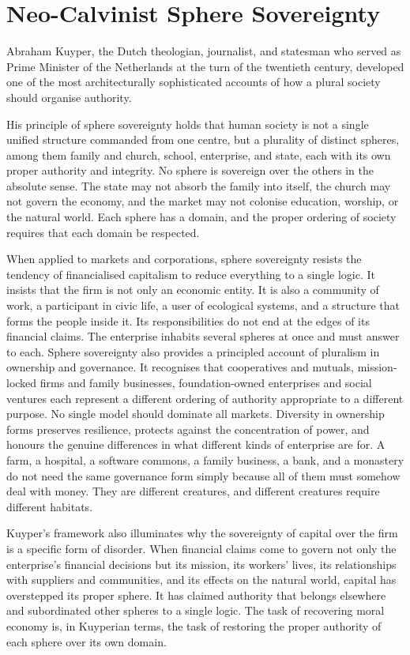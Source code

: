\documentclass[11pt,a4paper,oneside]{book}
\begin{document}
\section*{Neo-Calvinist Sphere Sovereignty}

Abraham Kuyper, the Dutch theologian, journalist, and statesman who served as Prime Minister of the Netherlands at the turn of the twentieth century, developed one of the most architecturally sophisticated accounts of how a plural society should organise authority.

His principle of sphere sovereignty holds that human society is not a single unified structure commanded from one centre, but a plurality of distinct spheres, among them family and church, school, enterprise, and state, each with its own proper authority and integrity. No sphere is sovereign over the others in the absolute sense. The state may not absorb the family into itself, the church may not govern the economy, and the market may not colonise education, worship, or the natural world. Each sphere has a domain, and the proper ordering of society requires that each domain be respected.

When applied to markets and corporations, sphere sovereignty resists the tendency of financialised capitalism to reduce everything to a single logic. It insists that the firm is not only an economic entity. It is also a community of work, a participant in civic life, a user of ecological systems, and a structure that forms the people inside it. Its responsibilities do not end at the edges of its financial claims. The enterprise inhabits several spheres at once and must answer to each. Sphere sovereignty also provides a principled account of pluralism in ownership and governance. It recognises that cooperatives and mutuals, mission-locked firms and family businesses, foundation-owned enterprises and social ventures each represent a different ordering of authority appropriate to a different purpose. No single model should dominate all markets. Diversity in ownership forms preserves resilience, protects against the concentration of power, and honours the genuine differences in what different kinds of enterprise are for. A farm, a hospital, a software commons, a family business, a bank, and a monastery do not need the same governance form simply because all of them must somehow deal with money. They are different creatures, and different creatures require different habitats.

Kuyper's framework also illuminates why the sovereignty of capital over the firm is a specific form of disorder. When financial claims come to govern not only the enterprise's financial decisions but its mission, its workers' lives, its relationships with suppliers and communities, and its effects on the natural world, capital has overstepped its proper sphere. It has claimed authority that belongs elsewhere and subordinated other spheres to a single logic. The task of recovering moral economy is, in Kuyperian terms, the task of restoring the proper authority of each sphere over its own domain.
\end{document}
